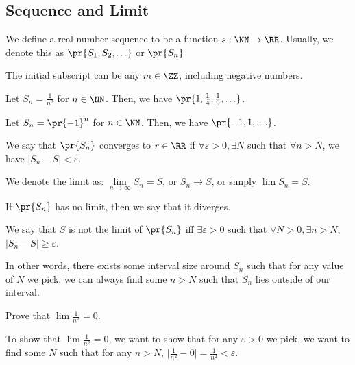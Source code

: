 \documentclass[openany]{book}
\begin{document}
\subsection{Sequence and Limit}
\begin{defn}[Sequence]
	We define a real number sequence to be a function $s : \NN \rightarrow \RR$. Usually, we denote this as $\pr{S_1, S_2, \ldots}$ or $\pr{S_n}$
\end{defn}
\begin{rmk}
	The initial subscript can be any $m \in \ZZ$, including negative numbers.
\end{rmk}

\begin{example}
	Let $S_n = \frac{1}{n^{2}}$ for $n \in \NN$. Then, we have $\pr{1, \frac{1}{4}, \frac{1}{9}, \ldots}$.
	
	Let $S_n = \pr{-1}^{n}$ for $n \in \NN$. Then, we have $\pr{-1, 1, \ldots}$.
\end{example}

\begin{defn}
	We say that $\pr{S_n}$ converges to $r \in \RR$ if $\forall \varepsilon > 0, \exists N$ such that $\forall n > N$, we have $\lvert S_n - S \rvert < \varepsilon$.
	
	We denote the limit as: $\lim\limits_{n \rightarrow \infty} S_n = S$, or $S_n \rightarrow S$, or simply $\lim S_n = S$.
	
\end{defn}
\begin{rmk}
	If $\pr{S_n}$ has no limit, then we say that it diverges.
\end{rmk}


\begin{rmk}
	We say that $S$ is not the limit of $\pr{S_n}$ iff $\exists \varepsilon > 0$ such that $\forall N > 0, \exists n > N$, $\lvert S_n - S \rvert \geq \varepsilon$.
	
	In other words, there exists some interval size around $S_n$ such that for any value of $N$ we pick, we can always find some $n > N$ such that $S_n$ lies outside of our interval.
\end{rmk}

\begin{example}
	Prove that $\lim \frac{1}{n^{2}} = 0$.
\end{example}
To show that $\lim \frac{1}{n^{2}} = 0$, we want to show that for any $\varepsilon > 0$ we pick, we want to find some $N$ such that for any $n > N$, $\lvert \frac{1}{n^{2}} - 0 \rvert = \frac{1}{n^{2}} < \varepsilon$.
\end{document}
